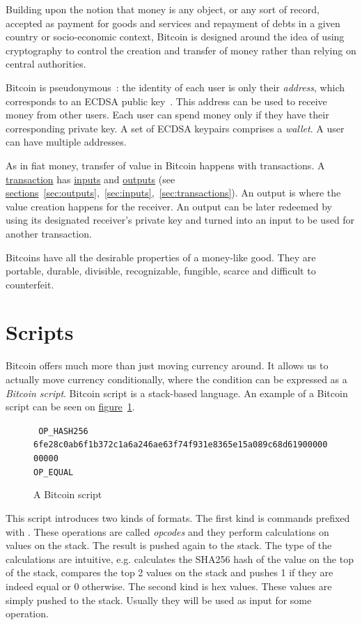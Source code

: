 Building upon the notion that money is any object, or any sort of record, accepted as payment for goods and services and repayment of debts in a given country or socio-economic context, Bitcoin is designed around the idea of using cryptography to control the creation and transfer of money rather than relying on central authorities.

Bitcoin is pseudonymous~\cite{gtklocker}: the identity of each user is only their \emph{address}, which corresponds to an ECDSA public key~\cite{ecdsa}. This address can be used to receive money from other users. Each user can spend money only if they have their corresponding private key. A set of ECDSA keypairs comprises a \emph{wallet}. A user can have multiple addresses.

As in fiat money, transfer of value in Bitcoin happens with transactions. A \hyperref[sec:transactions]{transaction} has \hyperref[sec:inputs]{inputs} and \hyperref[sec:outputs]{outputs} (see \hyperref[sec:outputs]{sections}~\ref{sec:outputs},~\ref{sec:inputs},~\ref{sec:transactions}). An output is where the value creation happens for the receiver. An output can be later redeemed by using its designated receiver's private key and turned into an input to be used for another transaction.

Bitcoins have all the desirable properties of a money-like good. They are portable, durable, divisible, recognizable, fungible, scarce and difficult to counterfeit.

\section{Scripts}
Bitcoin offers much more than just moving currency around. It allows us to actually move currency conditionally, where the condition can be expressed as a \emph{Bitcoin script}. Bitcoin script is a stack-based language. An example of a Bitcoin script can be seen on \hyperref[fig:bitcoin-script]{figure}~\ref{fig:bitcoin-script}.

\begin{figure}[hb]
  \centering
  {
    \tt
    OP\_HASH256 \\
    6fe28c0ab6f1b372c1a6a246ae63f74f931e8365e15a089c68d6190000000000 \\
    OP\_EQUAL
  }
  \caption{A Bitcoin script~\cite{gtklocker}}
  \label{fig:bitcoin-script}
\end{figure}

This script introduces two kinds of formats. The first kind is commands prefixed with . These operations are called \emph{opcodes} and they perform calculations on values on the stack. The result is pushed again to the stack. The type of the calculations are intuitive, e.g.  calculates the SHA256 hash of the value on the top of the stack,  compares the top 2 values on the stack and pushes 1 if they are indeed equal or 0 otherwise. The second kind is hex values. These values are simply pushed to the stack. Usually they will be used as input for some operation.

